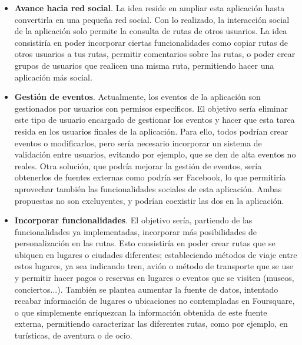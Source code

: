 \begin{itemize}
	\item \textbf{Avance hacia red social}. La idea reside en ampliar esta aplicación hasta convertirla en una pequeña red social. Con lo realizado, la interacción social de la aplicación solo permite la consulta de rutas de otros usuarios. La idea consistiría en poder incorporar ciertas funcionalidades como copiar rutas de otros usuarios a tus rutas, permitir comentarios sobre las rutas, o poder crear grupos de usuarios que realicen una misma ruta, permitiendo hacer una aplicación más social.
	
	\item \textbf{Gestión de eventos}. Actualmente, los eventos de la aplicación son gestionados por usuarios con permisos específicos. El objetivo sería eliminar este tipo de usuario encargado de gestionar los eventos y hacer que esta tarea resida en los usuarios finales de la aplicación. Para ello, todos podrían crear eventos o modificarlos, pero sería necesario incorporar un sistema de validación entre usuarios, evitando por ejemplo, que se den de alta eventos no reales. Otra solución, que podría mejorar la gestión de eventos, sería obtenerlos de fuentes externas como podría ser Facebook, lo que permitiría aprovechar también las funcionalidades sociales de esta aplicación. Ambas propuestas no son excluyentes, y podrían coexistir las dos en la aplicación.

	\item \textbf{Incorporar funcionalidades}. El objetivo sería, partiendo de las funcionalidades ya implementadas, incorporar más posibilidades de personalización en las rutas. Esto consistiría en poder crear rutas que se ubiquen en lugares o ciudades diferentes; estableciendo métodos de viaje entre estos lugares, ya sea indicando tren, avión o método de transporte que se use y permitir hacer pagos o reservas en lugares o eventos que se visiten (museos, conciertos...). También se plantea aumentar la fuente de datos, intentado recabar información de lugares o ubicaciones no contempladas en Foursquare, o que simplemente enriquezcan la información obtenida de este fuente externa, permitiendo caracterizar las diferentes rutas, como por ejemplo, en turísticas, de aventura o de ocio.

\end{itemize}












